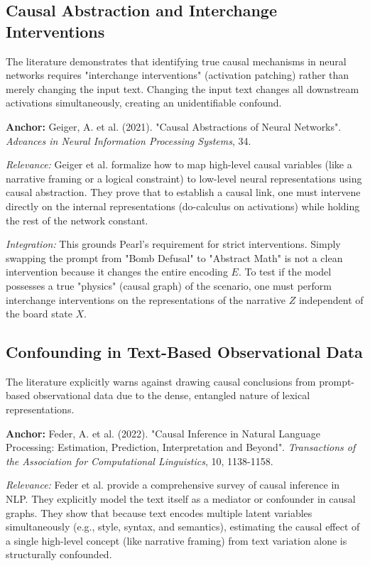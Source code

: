 \documentclass[12pt,a4paper]{article}
\begin{document}
\subsection{Causal Abstraction and Interchange Interventions}
The literature demonstrates that identifying true causal mechanisms in neural networks requires "interchange interventions" (activation patching) rather than merely changing the input text. Changing the input text changes all downstream activations simultaneously, creating an unidentifiable confound.

\textbf{Anchor:} Geiger, A. et al. (2021). "Causal Abstractions of Neural Networks". \textit{Advances in Neural Information Processing Systems}, 34.

\textit{Relevance:} Geiger et al. formalize how to map high-level causal variables (like a narrative framing or a logical constraint) to low-level neural representations using causal abstraction. They prove that to establish a causal link, one must intervene directly on the internal representations (do-calculus on activations) while holding the rest of the network constant.

\textit{Integration:} This grounds Pearl's requirement for strict interventions. Simply swapping the prompt from "Bomb Defusal" to "Abstract Math" is not a clean intervention because it changes the entire encoding $E$. To test if the model possesses a true "physics" (causal graph) of the scenario, one must perform interchange interventions on the representations of the narrative $Z$ independent of the board state $X$.

\subsection{Confounding in Text-Based Observational Data}
The literature explicitly warns against drawing causal conclusions from prompt-based observational data due to the dense, entangled nature of lexical representations.

\textbf{Anchor:} Feder, A. et al. (2022). "Causal Inference in Natural Language Processing: Estimation, Prediction, Interpretation and Beyond". \textit{Transactions of the Association for Computational Linguistics}, 10, 1138-1158.

\textit{Relevance:} Feder et al. provide a comprehensive survey of causal inference in NLP. They explicitly model the text itself as a mediator or confounder in causal graphs. They show that because text encodes multiple latent variables simultaneously (e.g., style, syntax, and semantics), estimating the causal effect of a single high-level concept (like narrative framing) from text variation alone is structurally confounded.
\end{document}

